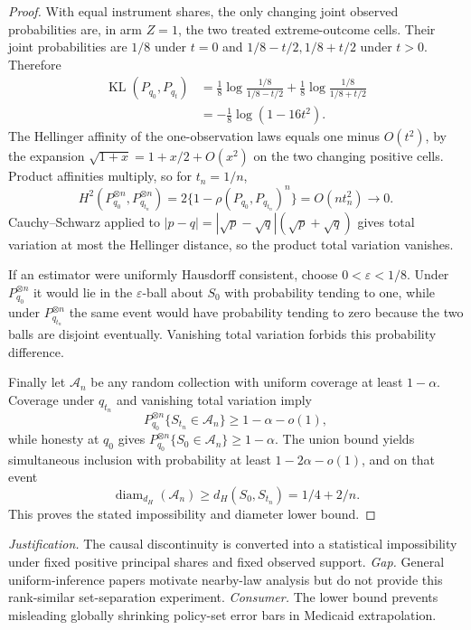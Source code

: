\documentclass{article}
\begin{document}
\begin{proof}
With equal instrument shares, the only changing joint observed probabilities are, in arm \(Z=1\), the two treated extreme-outcome cells.  Their joint probabilities are \(1/8\) under \(t=0\) and \(1/8-t/2,1/8+t/2\) under \(t>0\).  Therefore
\[
\begin{aligned}
\operatorname{KL}(P_{q_0},P_{q_t})
&=\frac18\log\frac{1/8}{1/8-t/2}
 +\frac18\log\frac{1/8}{1/8+t/2}\\
&=-\frac18\log(1-16t^2).
\end{aligned}
\]
The Hellinger affinity of the one-observation laws equals one minus \(O(t^2)\), by the expansion \(\sqrt{1+x}=1+x/2+O(x^2)\) on the two changing positive cells.  Product affinities multiply, so for \(t_n=1/n\),
\[
H^2(P_{q_0}^{\otimes n},P_{q_{t_n}}^{\otimes n})
=2\{1-\rho(P_{q_0},P_{q_{t_n}})^n\}=O(nt_n^2)\to0.
\]
Cauchy--Schwarz applied to \(|p-q|=|\sqrt p-\sqrt q|(\sqrt p+\sqrt q)\) gives total variation at most the Hellinger distance, so the product total variation vanishes.

If an estimator were uniformly Hausdorff consistent, choose \(0<\varepsilon<1/8\).  Under \(P_{q_0}^{\otimes n}\) it would lie in the \(\varepsilon\)-ball about \(S_0\) with probability tending to one, while under \(P_{q_{t_n}}^{\otimes n}\) the same event would have probability tending to zero because the two balls are disjoint eventually.  Vanishing total variation forbids this probability difference.

Finally let \(\mathcal A_n\) be any random collection with uniform coverage at least \(1-\alpha\).  Coverage under \(q_{t_n}\) and vanishing total variation imply
\[
P_{q_0}^{\otimes n}\{S_{t_n}\in\mathcal A_n\}\ge1-\alpha-o(1),
\]
while honesty at \(q_0\) gives \(P_{q_0}^{\otimes n}\{S_0\in\mathcal A_n\}\ge1-\alpha\).  The union bound yields simultaneous inclusion with probability at least \(1-2\alpha-o(1)\), and on that event
\[
\operatorname{diam}_{d_H}(\mathcal A_n)\ge d_H(S_0,S_{t_n})=1/4+2/n.
\]
This proves the stated impossibility and diameter lower bound.
\end{proof}
\par\smallskip\noindent \textit{Justification.} The causal discontinuity is converted into a statistical impossibility under fixed positive principal shares and fixed observed support. \textit{Gap.} General uniform-inference papers motivate nearby-law analysis but do not provide this rank-similar set-separation experiment. \textit{Consumer.} The lower bound prevents misleading globally shrinking policy-set error bars in Medicaid extrapolation.
\end{document}
